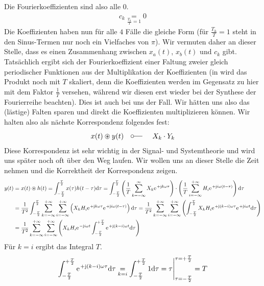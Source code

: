 \documentclass[11pt,a4paper,DIV=12]{scrartcl}
\newcommand{\diff}{\mathrm{d}}
\begin{document}
Die Fourierkoeffizienten sind also alle $0$.
%
%
\begin{align}
	c_k\underset{\frac{T_h}{T}=1}{=}0
\end{align}
%
%
Die Koeffizienten haben nun für alle $4$ Fälle die gleiche Form (für
$\frac{T_h}{T}=1$ steht in den Sinus-Termen nur noch ein Vielfaches von $\pi$).
%
Wir vermuten daher an dieser Stelle, dass es einen Zusammenhang zwischen
$x_{a}(t)$, $x_{b}(t)$ und $c_k$ gibt.
%
Tatsächlich ergibt sich der Fourierkoeffizient einer Faltung zweier gleich
periodischer Funktionen aus der Multiplikation der Koeffizienten (in \cite[Kap. 3, S. 208]{Oppenheim1997} wird das Produkt noch mit $T$ skaliert, denn die Koeffizienten werden im Gegensatz zu hier mit dem Faktor $\frac{1}{T}$ versehen, während wir diesen erst wieder bei der Synthese der Fourierreihe beachten).
%
Dies ist auch bei uns der Fall.
%
Wir hätten uns also das (lästige) Falten sparen und direkt die Koeffizienten
multiplizieren können. Wir halten also als nächste Korrespondenz folgendes fest:
%
\begin{align}
	x(t)\circledast y(t)\quad\fourier\quad X_k\cdot Y_k
\end{align}
%
Diese Korrespondenz ist sehr wichtig in der Signal- und Systemtheorie und wird
uns später noch oft über den Weg laufen.
%
Wir wollen uns an dieser Stelle die Zeit nehmen und die Korrektheit der
Korrespondenz zeigen.
%
%
\begin{align}
	y(t)&=x(t)\circledast h(t)
	=\int_{-\frac{T}{2}}^{\frac{T}{2}}x(\tau)h(t-\tau)\diff \tau
	=\int_{-\frac{T}{2}}^{\frac{T}{2}}\left (\frac{1}{T}\sum_{k=-\infty}^{\infty}X_k\e^{+\im k \omega \tau}\right )\cdot \left (\frac{1}{T}\sum_{i=-\infty}^{+\infty}H_i\e^{+\im i \omega (t-\tau)}\right )\diff \tau\nonumber \\
	&=\frac{1}{T^2}\int_{-\frac{T}{2}}^{\frac{T}{2}}\sum_{k=-\infty}^{+\infty}\sum_{i=-\infty}^{+\infty}\left (X_kH_i\e^{+\im k \omega \tau}\e^{+\im i \omega (t-\tau)}\right )\diff \tau
	=\frac{1}{T^2}\sum_{k=-\infty}^{+\infty}\sum_{i=-\infty}^{+\infty}\left (\int_{-\frac{T}{2}}^{\frac{T}{2}}X_kH_i\e^{+\im (k-i) \omega \tau}\e^{+\im i \omega t}\diff \tau\right )\nonumber \\
	&=\frac{1}{T^2}\sum_{k=-\infty}^{+\infty}\sum_{i=-\infty}^{+\infty}\left (X_kH_i\e^{-\im i \omega t}\int_{-\frac{T}{2}}^{+\frac{T}{2}}\e^{+\im (k-i)\omega t}\diff \tau \right )
\end{align}
%
%
Für $k=i$ ergibt das Integral $T$.
%
%
\begin{align}
	\int_{-\frac{T}{2}}^{+\frac{T}{2}}\e^{+\im (k-i)\omega \tau}\diff \tau \underset{k=i}{=}\int_{-\frac{T}{2}}^{+\frac{T}{2}}1\diff \tau =\tau \Bigg |_{\tau=-\frac{T}{2}}^{\tau=+\frac{T}{2}}=T
\end{align}
\end{document}
